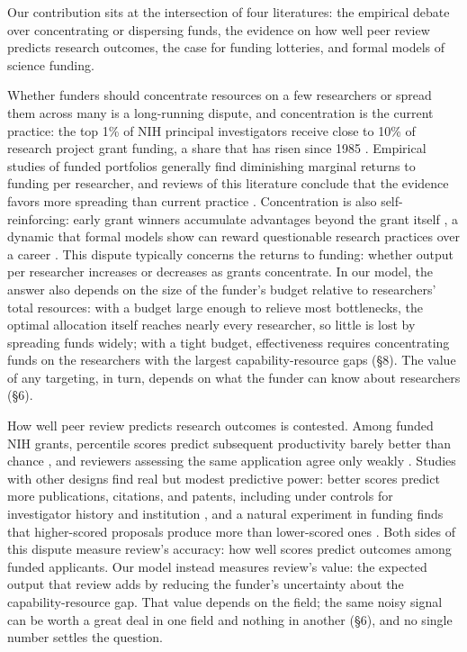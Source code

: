 \documentclass[article, 11pt, reqno]{amsart}
\theoremstyle{named}
\begin{document}
Our contribution sits at the intersection of four literatures: the empirical debate over concentrating or dispersing funds, the evidence on how well peer review predicts research outcomes, the case for funding lotteries, and formal models of science funding.

Whether funders should concentrate resources on a few researchers or spread them across many is a long-running dispute, and concentration is the current practice: the top 1\% of NIH principal investigators receive close to 10\% of research project grant funding, a share that has risen since 1985 \citep{KatzMatter2020, Lauer2021}. Empirical studies of funded portfolios generally find diminishing marginal returns to funding per researcher, and reviews of this literature conclude that the evidence favors more spreading than current practice \citep{Mongeon2016, Aagaard2020}. Concentration is also self-reinforcing: early grant winners accumulate advantages beyond the grant itself \citep{BolVaanRijt2018}, a dynamic that formal models show can reward questionable research practices over a career \citep{Heesen2024}. This dispute typically concerns the returns to funding: whether output per researcher increases or decreases as grants concentrate. In our model, the answer also depends on the size of the funder's budget relative to researchers' total resources: with a budget large enough to relieve most bottlenecks, the optimal allocation itself reaches nearly every researcher, so little is lost by spreading funds widely; with a tight budget, effectiveness requires concentrating funds on the researchers with the largest capability-resource gaps (\S8). The value of any targeting, in turn, depends on what the funder can know about researchers (\S6).

How well peer review predicts research outcomes is contested. Among funded NIH grants, percentile scores predict subsequent productivity barely better than chance \citep{Fang2016}, and reviewers assessing the same application agree only weakly \citep{Pier2018}. Studies with other designs find real but modest predictive power: better scores predict more publications, citations, and patents, including under controls for investigator history and institution \citep{LiAgha2015}, and a natural experiment in funding finds that higher-scored proposals produce more than lower-scored ones \citep{ParkLeeKim2015}. Both sides of this dispute measure review's accuracy: how well scores predict outcomes among funded applicants. Our model instead measures review's value: the expected output that review adds by reducing the funder's uncertainty about the capability-resource gap. That value depends on the field; the same noisy signal can be worth a great deal in one field and nothing in another (\S6), and no single number settles the question.
\end{document}
